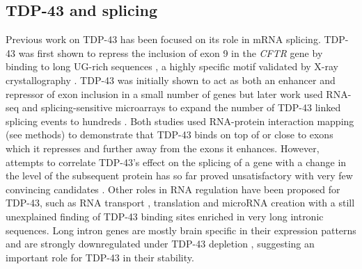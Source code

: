 \subsection{TDP-43 and splicing}
Previous work on TDP-43 has been focused on its role in mRNA splicing. TDP-43 was first shown to repress the inclusion of exon 9 in the \emph{CFTR} gene by binding to long UG-rich sequences \citep{Buratti2001-et}, a highly specific motif validated by X-ray crystallography \citep{Lukavsky2013}. TDP-43 was initially shown to act as both an enhancer and repressor of exon inclusion in a small number of genes \citep{Mercado2005-js,Bose2008-du,Shiga2012-it} but later work used RNA-seq and splicing-sensitive microarrays to expand the number of TDP-43 linked splicing events to hundreds  \citep{Polymenidou2011,Tollervey2011}. Both studies used RNA-protein interaction mapping (see methods) to demonstrate that TDP-43 binds on top of or close to exons which it represses and further away from the exons it enhances. However, attempts to correlate TDP-43's effect on the splicing of a gene with a change in the level of the subsequent protein has so far proved unsatisfactory with very few convincing candidates \citep{DeConti2015,Stalekar2015}.
Other roles in RNA regulation have been proposed for TDP-43, such as RNA transport \citep{Alami2013}, translation \citep{Freibaum2010-hw} and microRNA creation \citep{Kawahara2012} with a still unexplained finding of TDP-43 binding sites enriched in very long intronic sequences. Long intron genes are mostly brain specific in their expression patterns \citep{Sibley2015} and are strongly downregulated under TDP-43 depletion \citep{Polymenidou2011}, suggesting an important role for TDP-43 in their stability.  





%


